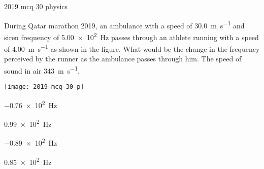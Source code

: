 \ylDisplay
{}%
{2019}%
{mcq}%
{30}%
{physics}%
{}%
{
\ifStatement
During Qatar marathon 2019, an ambulance with a speed of \SI{30.0}{\m\per\s} and siren frequency  of \SI{5.00e2}{\Hz}  passes through an athlete running with a speed of \SI{4.00}{\m\per\s} as shown in the figure. What would be the change in the frequency perceived by the runner as the ambulance passes through him. The speed of sound in air \SI{343}{\m\per\s}.
\begin{center}
  \texttt{[image: 2019-mcq-30-p]}
\end{center}
\fi


\SI{-0.76e2}{\Hz}
\fi


\SI{0.99e2}{\Hz}
\fi


\SI{-0.89e2}{\Hz}
\fi


\SI{0.85e2}{\Hz}
\fi


\ifHint

\fi


\ifSolution

\fi


\ifEstStatement

\fi



\fi



\fi



\fi



\fi


\ifEstHint

\fi


\ifEstSolution

\fi
}
